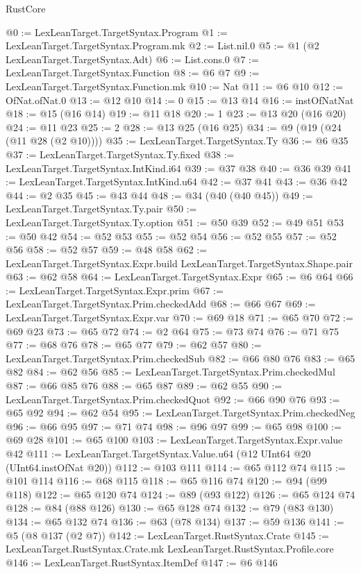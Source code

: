 \begin{lexlean}{RustCore}
\begin{coremodule}
{\begin{coremodule}
{{{{{@0 := LexLeanTarget.TargetSyntax.Program
@1 := LexLeanTarget.TargetSyntax.Program.mk
@2 := List.nil.{0}
@5 := @1 (@2 LexLeanTarget.TargetSyntax.Adt)
@6 := List.cons.{0}
@7 := LexLeanTarget.TargetSyntax.Function
@8 := @6 @7
@9 := LexLeanTarget.TargetSyntax.Function.mk
@10 := Nat
@11 := @6 @10
@12 := OfNat.ofNat.{0}
@13 := @12 @10
@14 := 0
@15 := @13 @14
@16 := instOfNatNat
@18 := @15 (@16 @14)
@19 := @11 @18
@20 := 1
@23 := @13 @20 (@16 @20)
@24 := @11 @23
@25 := 2
@28 := @13 @25 (@16 @25)
@34 := @9 (@19 (@24 (@11 @28 (@2 @10))))
@35 := LexLeanTarget.TargetSyntax.Ty
@36 := @6 @35
@37 := LexLeanTarget.TargetSyntax.Ty.fixed
@38 := LexLeanTarget.TargetSyntax.IntKind.i64
@39 := @37 @38
@40 := @36 @39
@41 := LexLeanTarget.TargetSyntax.IntKind.u64
@42 := @37 @41
@43 := @36 @42
@44 := @2 @35
@45 := @43 @44
@48 := @34 (@40 (@40 @45))
@49 := LexLeanTarget.TargetSyntax.Ty.pair
@50 := LexLeanTarget.TargetSyntax.Ty.option
@51 := @50 @39
@52 := @49 @51
@53 := @50 @42
@54 := @52 @53
@55 := @52 @54
@56 := @52 @55
@57 := @52 @56
@58 := @52 @57
@59 := @48 @58
@62 := LexLeanTarget.TargetSyntax.Expr.build LexLeanTarget.TargetSyntax.Shape.pair
@63 := @62 @58
@64 := LexLeanTarget.TargetSyntax.Expr
@65 := @6 @64
@66 := LexLeanTarget.TargetSyntax.Expr.prim
@67 := LexLeanTarget.TargetSyntax.Prim.checkedAdd
@68 := @66 @67
@69 := LexLeanTarget.TargetSyntax.Expr.var
@70 := @69 @18
@71 := @65 @70
@72 := @69 @23
@73 := @65 @72
@74 := @2 @64
@75 := @73 @74
@76 := @71 @75
@77 := @68 @76
@78 := @65 @77
@79 := @62 @57
@80 := LexLeanTarget.TargetSyntax.Prim.checkedSub
@82 := @66 @80 @76
@83 := @65 @82
@84 := @62 @56
@85 := LexLeanTarget.TargetSyntax.Prim.checkedMul
@87 := @66 @85 @76
@88 := @65 @87
@89 := @62 @55
@90 := LexLeanTarget.TargetSyntax.Prim.checkedQuot
@92 := @66 @90 @76
@93 := @65 @92
@94 := @62 @54
@95 := LexLeanTarget.TargetSyntax.Prim.checkedNeg
@96 := @66 @95
@97 := @71 @74
@98 := @96 @97
@99 := @65 @98
@100 := @69 @28
@101 := @65 @100
@103 := LexLeanTarget.TargetSyntax.Expr.value @42
@111 := LexLeanTarget.TargetSyntax.Value.u64 (@12 UInt64 @20 (UInt64.instOfNat @20))
@112 := @103 @111
@114 := @65 @112 @74
@115 := @101 @114
@116 := @68 @115
@118 := @65 @116 @74
@120 := @94 (@99 @118)
@122 := @65 @120 @74
@124 := @89 (@93 @122)
@126 := @65 @124 @74
@128 := @84 (@88 @126)
@130 := @65 @128 @74
@132 := @79 (@83 @130)
@134 := @65 @132 @74
@136 := @63 (@78 @134)
@137 := @59 @136
@141 := @5 (@8 @137 (@2 @7))
@142 := LexLeanTarget.RustSyntax.Crate
@145 := LexLeanTarget.RustSyntax.Crate.mk LexLeanTarget.RustSyntax.Profile.core
@146 := LexLeanTarget.RustSyntax.ItemDef
@147 := @6 @146
}}}}}
\end{coremodule}}
\end{coremodule}
\end{lexlean}
